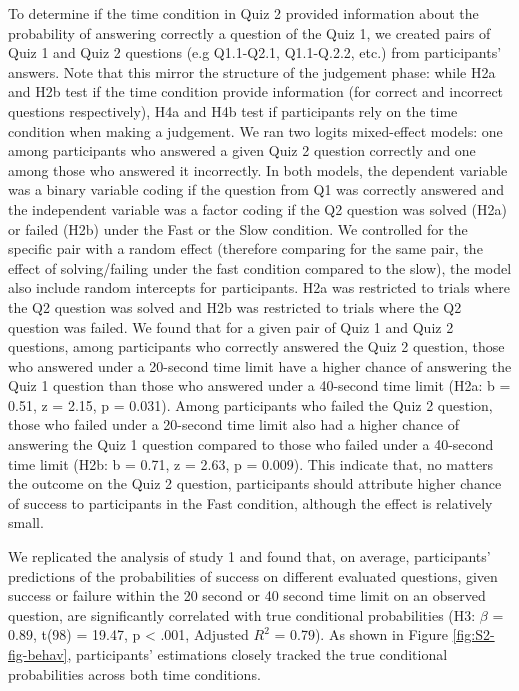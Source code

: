 \documentclass[10pt,letterpaper]{article}
\begin{document}
To determine if the time condition in Quiz 2 provided information about the probability of answering correctly a question of the Quiz 1, we created pairs of Quiz 1 and Quiz 2 questions (e.g Q1.1-Q2.1, Q1.1-Q.2.2, etc.) from participants' answers. Note that this mirror the structure of the judgement phase: while H2a and H2b test if the time condition provide information (for correct and incorrect questions respectively), H4a and H4b test if participants rely on the time condition when making a judgement. We ran two logits mixed-effect models: one among participants who answered a given Quiz 2 question correctly and one among those who answered it incorrectly. In both models, the dependent variable was a binary variable coding if the question from Q1 was correctly answered and the independent variable was a factor coding if the Q2 question was solved (H2a) or failed (H2b) under the Fast or the Slow condition. We controlled for the specific pair with a random effect (therefore comparing for the same pair, the effect of solving/failing under the fast condition compared to the slow), the model also include random intercepts for participants. H2a was restricted to trials where the Q2 question was solved and H2b was restricted to trials where the Q2 question was failed. We found that for a given pair of Quiz 1 and Quiz 2 questions, among participants who correctly answered the Quiz 2 question, those who answered under a 20-second time limit have a higher chance of answering the Quiz 1 question than those who answered under a 40-second time limit (H2a: b = 0.51, z = 2.15, p = 0.031). Among participants who failed the Quiz 2 question, those who failed under a 20-second time limit also had a higher chance of answering the Quiz 1 question compared to those who failed under a 40-second time limit (H2b: b = 0.71, z = 2.63, p = 0.009). This indicate that, no matters the outcome on the Quiz 2 question, participants should attribute higher chance of success to participants in the Fast condition, although the effect is relatively small.

We replicated the analysis of study 1 and found that, on average, participants' predictions of the probabilities of success on different evaluated questions, given success or failure within the 20 second or 40 second time limit on an observed question, are significantly correlated with true conditional probabilities (H3: \(\beta\) = 0.89, t(98) = 19.47, p \textless{} .001, Adjusted \(R^2\) = 0.79). As shown in Figure \ref{fig:S2-fig-behav}, participants' estimations closely tracked the true conditional probabilities across both time conditions.
\end{document}
